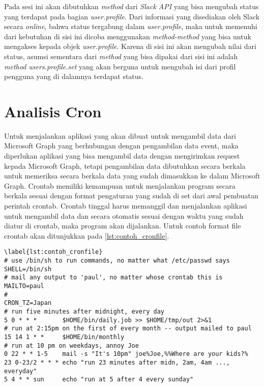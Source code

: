 Pada sesi ini akan dibutuhkan \textit{method} dari \textit{Slack API} yang bisa mengubah status yang terdapat pada bagian \textit{user.profile}. Dari informasi yang disediakan oleh Slack secara \textit{online}, bahwa status tergabung dalam \textit{user.profile}, maka untuk memenuhi dari kebutuhan di sisi ini dicoba menggunakan \textit{method-method} yang bisa untuk mengakses kepada objek \textit{user.profile}. Karena di sisi ini akan mengubah nilai dari status, asumsi sementara dari \textit{method} yang bisa dipakai dari sisi ini adalah \textit{method users.profile.set} yang akan berguna untuk mengubah isi dari profil pengguna yang di dalamnya terdapat status. 

\section{Analisis Cron}
\label{sec:analisis_cron}
Untuk menjalankan aplikasi yang akan dibuat untuk mengambil data dari Microsoft Graph yang berhubungan dengan pengambilan data event, maka diperlukan aplikasi yang bisa mengambil data dengan mengirimkan request kepada Microsoft Graph, tetapi pengambilan data dibutuhkan secara berkala untuk memeriksa secara berkala data yang sudah dimasukkan ke dalam Microsoft Graph. Crontab memiliki kemampuan untuk menjalankan program secara berkala sesuai dengan format pengaturan yang sudah di set dari awal pembuatan perintah crontab. Crontab tinggal harus memanggil dan menjalankan aplikasi untuk mengambil data dan secara otomatis sesuai dengan waktu yang sudah diatur di crontab, maka program akan dijalankan. Untuk contoh format file crontab akan ditunjukkan pada \ref{lst:contoh_cronfile}.

\begin{lstlisting}[caption=contoh cronfile]
\label{lst:contoh_cronfile}
# use /bin/sh to run commands, no matter what /etc/passwd says
SHELL=/bin/sh
# mail any output to 'paul', no matter whose crontab this is
MAILTO=paul
#
CRON_TZ=Japan
# run five minutes after midnight, every day
5 0 * * *       $HOME/bin/daily.job >> $HOME/tmp/out 2>&1
# run at 2:15pm on the first of every month -- output mailed to paul
15 14 1 * *     $HOME/bin/monthly
# run at 10 pm on weekdays, annoy Joe
0 22 * * 1-5    mail -s "It's 10pm" joe%Joe,%%Where are your kids?%
23 0-23/2 * * * echo "run 23 minutes after midn, 2am, 4am ..., everyday"
5 4 * * sun     echo "run at 5 after 4 every sunday"
\end{lstlisting}